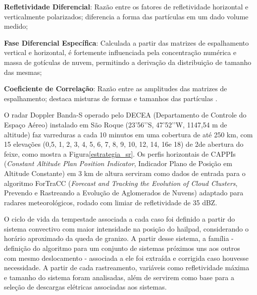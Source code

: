 \begin{alineas}
	\item \textbf{Refletividade Diferencial}: Razão entre os fatores de refletividade horizontal e verticalmente polarizados; diferencia a forma das partículas em um dado volume medido;
	\item \textbf{Fase Diferencial Específica}: Calculada a partir das matrizes de espalhamento vertical e horizontal, é fortemente influenciada pela concentração numérica e massa de gotículas de nuvem, permitindo a derivação da distribuição de tamanho das mesmas;
	\item \textbf{Coeficiente de Correlação}: Razão entre as amplitudes das matrizes de espalhamento; destaca misturas de formas e tamanhos das partículas \cite{Rauber2018}.
\end{alineas}

O radar Doppler Banda-S operado pelo DECEA (Departamento de Controle do Espaço Aéreo) instalado em São Roque (23’56’’S, 47’52’’W, 1147,54 m de altitude) faz varreduras a cada 10 minutos em uma cobertura de até 250 km, com 15 elevações (0,5\textdegree, 1\textdegree, 2\textdegree, 3\textdegree, 4\textdegree, 5\textdegree, 6\textdegree, 7\textdegree, 8\textdegree, 9\textdegree, 10\textdegree, 12\textdegree, 14\textdegree, 16\textdegree e 18\textdegree) de 2\textdegree de abertura do feixe, como mostra a Figura\autoref{estrategia_sr}. Os perfis horizontais de CAPPIs (\textit{Constant Altitude Plan Position Indicator}, Indicador Plano de Posição em Altitude Constante) em 3 km de altura serviram como dados de entrada para o algoritmo ForTraCC (\textit{Forecast and Tracking the Evolution of Cloud Clusters}, Prevendo e Rastreando a Evolução de Aglomerados de Nuvens) \cite{Vila2008} adaptado para radares meteorológicos, rodado com limiar de refletividade de 35 dBZ.

O ciclo de vida da tempestade associada a cada caso foi definido a partir do sistema convectivo com maior intensidade na posição do hailpad, considerando o horário aproximado da queda de granizo. A partir desse sistema, a família - definição do algoritmo para um conjunto de sistemas próximos uns aos outros com mesmo deslocamento - associada a ele foi extraída e corrigida caso houvesse necessidade. A partir de cada rastreamento, variáveis como refletividade máxima e tamanho do sistema foram analisadas, além de servirem como base para a seleção de descargas elétricas associadas aos sistemas.

